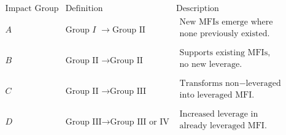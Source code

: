 \documentclass[letterpaper, 12pt]{article}
\begin{document}
\(\begin{matrix}
\mathrm{\text{Impact}}\mspace{6mu}\mathrm{\text{Group}} & \mathrm{\text{Definition}} & \mathrm{\text{Description}} \\
A & \mathrm{\text{Group}}\mspace{6mu} I\mspace{6mu} \rightarrow \mathrm{\text{Group}}\mspace{6mu}\mathrm{\text{II}} & \begin{matrix}
\mathrm{\text{New}}\mspace{6mu}\mathrm{\text{MFIs}}\mspace{6mu}\mathrm{\text{emerge}}\mspace{6mu}\mathrm{\text{where}}\mspace{6mu} \\
\mathrm{\text{none}}\mspace{6mu}\mathrm{\text{previously}}\mspace{6mu}\mathrm{\text{existed}}.\mspace{6mu} \\
\end{matrix} \\
B & \mathrm{\text{Group}}\mspace{6mu}\mathrm{\text{II}}\mspace{6mu} \rightarrow \mathrm{\text{Group}}\mspace{6mu}\mathrm{\text{II}} & \begin{matrix}
\mathrm{\text{Supports}}\mspace{6mu}\mathrm{\text{existing}}\mspace{6mu}\mathrm{\text{MFIs}},\mspace{6mu} \\
\mathrm{\text{no}}\mspace{6mu}\mathrm{\text{new}}\mspace{6mu}\mathrm{\text{leverage}}. \\
\end{matrix} \\
C & \mathrm{\text{Group}}\mspace{6mu}\mathrm{\text{II}}\mspace{6mu} \rightarrow \mathrm{\text{Group}}\mspace{6mu}\mathrm{\text{III}} & \begin{matrix}
\mathrm{\text{Transforms}}\mspace{6mu}\mathrm{\text{non}} - \mathrm{\text{leveraged}}\mspace{6mu} \\
\mathrm{\text{into}}\mspace{6mu}\mathrm{\text{leveraged}}\mspace{6mu}\mathrm{\text{MFI}}. \\
\end{matrix} \\
D & \mathrm{\text{Group}}\mspace{6mu}\mathrm{\text{III}} \rightarrow \mathrm{\text{Group}}\mspace{6mu}\mathrm{\text{III}}\mspace{6mu}\mathrm{\text{or}}\mspace{6mu}\mathrm{\text{IV}} & \begin{matrix}
\mathrm{\text{Increased}}\mspace{6mu}\mathrm{\text{leverage}}\mspace{6mu}\mathrm{\text{in}}\mspace{6mu} \\
\mathrm{\text{already}}\mspace{6mu}\mathrm{\text{leveraged}}\mspace{6mu}\mathrm{\text{MFI}}. \\
\end{matrix} \\
\end{matrix}\)
\end{document}

